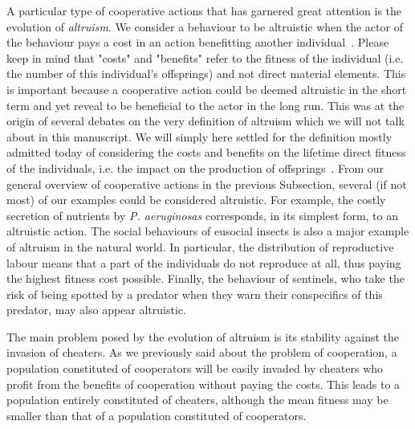     A particular type of cooperative actions that has garnered great attention is the evolution of \emph{altruism}. We consider a behaviour to be altruistic when the actor of the behaviour pays a cost in an action benefitting another individual~\parencite{Hamilton1964, West2007a}. Please keep in mind that "costs" and "benefits" refer to the fitness of the individual (i.e. the number of this individual's offsprings) and not direct material elements. This is important because a cooperative action could be deemed altruistic in the short term and yet reveal to be beneficial to the actor in the long run. This was at the origin of several debates on the very definition of altruism which we will not talk about in this manuscript. We will simply here settled for the definition mostly admitted today of considering the costs and benefits on the lifetime direct fitness of the individuals, i.e. the impact on the production of offsprings~\parencite{West2007a, Lehmann2006}. From our general overview of cooperative actions in the previous Subsection, several (if not most) of our examples could be considered altruistic. For example, the costly secretion of nutrients by \emph{P. aeruginosas} corresponds, in its simplest form, to an altruistic action. The social behaviours of eusocial insects is also a major example of altruism in the natural world. In particular, the distribution of reproductive labour means that a part of the individuals do not reproduce at all, thus paying the highest fitness cost possible. Finally, the behaviour of sentinels, who take the risk of being spotted by a predator when they warn their conspecifics of this predator, may also appear altruistic.


    The main problem posed by the evolution of altruism is its stability against the invasion of cheaters. As we previously said about the problem of cooperation, a population constituted of cooperators will be easily invaded by cheaters who profit from the benefits of cooperation without paying the costs. This leads to a population entirely constituted of cheaters, although the mean fitness may be smaller than that of a population constituted of cooperators.

